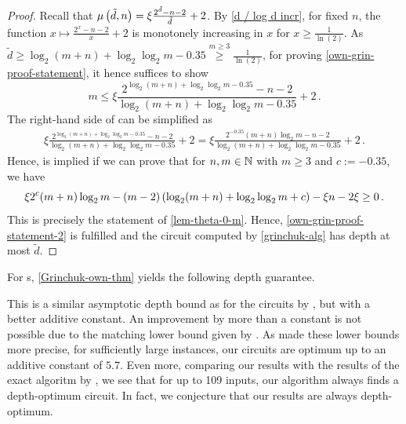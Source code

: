 \begin{proof}
  Recall that $\mu\left({\tilde{d}, n}\right) = \xi \frac{2^{\tilde{d}} - n - 2}{\tilde{d}} + 2$.
  By \cref{d / log d incr},
  for fixed $n$, the function $x \mapsto \frac{2^{x} - n - 2}{x} + 2$
  is monotonely increasing in $x$ for $x \geq \frac{1}{\ln (2)}$.
  As $\tilde d \geq \log_2(m+n) + \log_2 \log_2 m - 0.35 \overset{m \geq 3}{\geq} \frac{1}{\ln (2)}$,
  for proving \cref{own-grin-proof-statement}, it hence suffices to show
  \begin{equation} \label{own-grin-proof-statement-2}
   m \leq \xi \frac{2^{\log_2(m + n) + \log_2 \log_2 m - 0.35} - n - 2}{\log_2(m + n) + \log_2 \log_2 m - 0.35} + 2\,.
  \end{equation}
  The right-hand side of  can be simplified as
  \begin{align*}
     \xi\frac{2^{\log_2(m + n) + \log_2 \log_2 m - 0.35} - n - 2}{\log_2(m + n) + \log_2 \log_2 m - 0.35} + 2
   = \xi\frac{2^{-0.35} (m + n) \log_2 m - n - 2}{\log_2(m + n) + \log_2 \log_2 m - 0.35} + 2\,.
  \end{align*}
  Hence,  is implied if we can prove that
  for $n, m \in \mathbb N$ with $m \geq 3$ and $c := -0.35$, we have
  \[\xi 2^{c} (m + n) \log_2 m - (m-2) \left({\log_2(m + n) + \log_2 \log_2 m + c}\right) - \xi n - 2\xi \geq 0\,.\]
  This is precisely the statement of \cref{lem-theta-0-m}.
  Hence, \cref{own-grin-proof-statement-2} is fulfilled
  and the circuit computed by \cref{grinchuk-alg}
  has depth at most $\tilde d$.
 \end{proof}

For \aop{}s, \cref{Grinchuk-own-thm} yields the following depth guarantee.


This is a similar asymptotic depth bound as for the circuits by \citet{Grinchuk},
but with a better additive constant.
An improvement by more than a constant is not possible due to the matching lower bound
given by \citet{Commentz-Walter-mon}.
As \citet{Hitzschke2018} made these lower bounds more precise,
for sufficiently large instances,
our circuits are optimum up to an additive constant of $5.7$.
Even more, comparing our results with the results of the exact algoritm
by \citet{exact_aop},
we see that for up to 109 inputs,
our algorithm always finds a depth-optimum \aop{} circuit.
In fact, we conjecture that our results are always depth-optimum.


